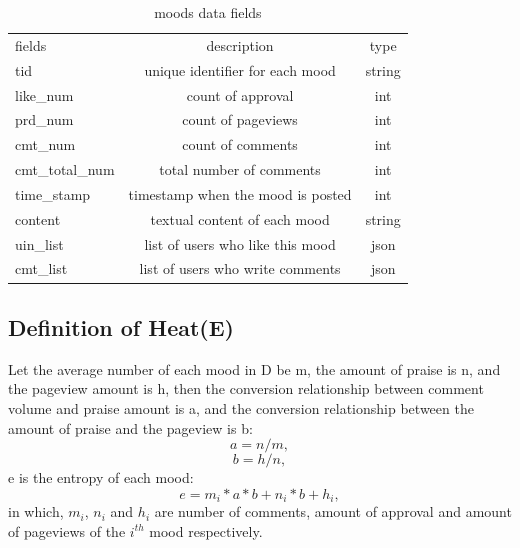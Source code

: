 \documentclass[10pt,twocolumn,letterpaper]{article}
\begin{document}
    \setlength{\tabcolsep}{1pt}
    \begin{table}
    \newcommand{\tabincell}[2]{\begin{tabular}{@{}#1@{}}#2\end{tabular}}
    \begin{center}
    \caption{moods data fields}
    \label{fields}
    \begin{tabular}{lcc}
    \hline\noalign{\smallskip}
     fields & description & type\\
    \noalign{\smallskip}
    \hline
    \noalign{\smallskip}
    tid & unique identifier for each mood & string\\
    like\_num & count of approval & int\\
    prd\_num & count of pageviews & int\\
    cmt\_num & count of comments & int\\
    cmt\_total\_num & total number of comments & int\\
    time\_stamp & timestamp when the mood is posted & int\\
    content & textual content of each mood & string\\
    uin\_list & list of users who like this mood & json\\
    cmt\_list & list of users who write comments & json\\
    \hline
    \end{tabular}
    \end{center}
    \end{table}
    \setlength{\tabcolsep}{1.4pt}

\subsection{Definition of Heat(E)}
    Let the average number of each mood in D be m, the amount of praise is n, and the pageview amount is h, then the conversion relationship between comment volume and praise amount is a, and the conversion relationship between the amount of praise and the pageview is b:
    \begin{equation}
    a = n / m,
    \end{equation}
    \begin{equation}
    b = h / n,
    \end{equation}
    e is the entropy of each mood:
    \begin{equation}
    e = m_{i} * a * b + n_{i} * b + h_{i},
    \end{equation}
    in which, $m_{i}$, $n_{i}$ and $h_{i}$ are number of comments, amount of approval and amount of pageviews of the $i^{th}$ mood respectively.
\end{document}
